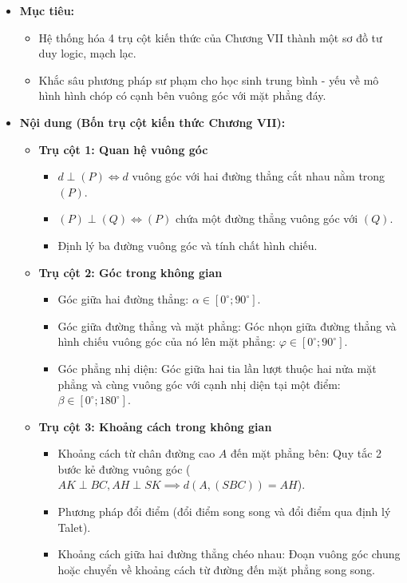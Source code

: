 \documentclass[12pt, a4paper]{article}
\begin{document}
\begin{itemize}[leftmargin=1.2cm]
    \item[a)] \textbf{Mục tiêu:}
    \begin{itemize}[leftmargin=0.6cm]
        \item Hệ thống hóa 4 trụ cột kiến thức của Chương VII thành một sơ đồ tư duy logic, mạch lạc.
        \item Khắc sâu phương pháp sư phạm cho học sinh trung bình - yếu về mô hình hình chóp có cạnh bên vuông góc với mặt phẳng đáy.
    \end{itemize}

    \item[b)] \textbf{Nội dung (Bốn trụ cột kiến thức Chương VII):}
    \begin{itemize}[leftmargin=0.6cm]
        \item \textbf{Trụ cột 1: Quan hệ vuông góc}
        \begin{itemize}
            \item $d \perp (P) \iff d$ vuông góc với hai đường thẳng cắt nhau nằm trong $(P)$.
            \item $(P) \perp (Q) \iff (P)$ chứa một đường thẳng vuông góc với $(Q)$.
            \item Định lý ba đường vuông góc và tính chất hình chiếu.
        \end{itemize}

        \item \textbf{Trụ cột 2: Góc trong không gian}
        \begin{itemize}
            \item Góc giữa hai đường thẳng: $\alpha \in [0^\circ; 90^\circ]$.
            \item Góc giữa đường thẳng và mặt phẳng: Góc nhọn giữa đường thẳng và hình chiếu vuông góc của nó lên mặt phẳng: $\varphi \in [0^\circ; 90^\circ]$.
            \item Góc phẳng nhị diện: Góc giữa hai tia lần lượt thuộc hai nửa mặt phẳng và cùng vuông góc với cạnh nhị diện tại một điểm: $\beta \in [0^\circ; 180^\circ]$.
        \end{itemize}

        \item \textbf{Trụ cột 3: Khoảng cách trong không gian}
        \begin{itemize}
            \item Khoảng cách từ chân đường cao $A$ đến mặt phẳng bên: Quy tắc 2 bước kẻ đường vuông góc ($AK \perp BC, AH \perp SK \implies d(A, (SBC)) = AH$).
            \item Phương pháp đổi điểm (đổi điểm song song và đổi điểm qua định lý Talet).
            \item Khoảng cách giữa hai đường thẳng chéo nhau: Đoạn vuông góc chung hoặc chuyển về khoảng cách từ đường đến mặt phẳng song song.
        \end{itemize}


\end{itemize}
\end{itemize}
\end{document}
